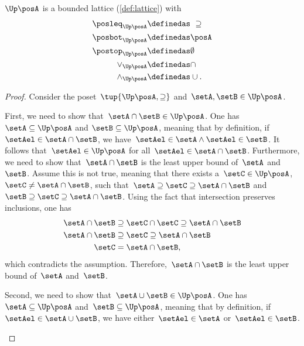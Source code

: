 \begin{lemma}
  \label{lem:u_bounded_lat}
  $\Up \posA$ is a bounded lattice (\cref{def:lattice}) with
  \begin{equation}
    \begin{aligned}
      \posleq_{\Up \posA}&\definedas \ \supseteq\\
      \posbot_{\Up \posA}&\definedas \posA\\
      \postop_{\Up \posA}&\definedas \emptyset\\
      \vee_{\Up \posA}&\definedas \cap\\
      \wedge_{\Up \posA}&\definedas \cup.
    \end{aligned}
\end{equation}
\end{lemma}
\begin{proof}
  Consider the poset~$\tup{\Up \posA,\supseteq}$ and~$\setA,\setB\in \Up \posA$.
  \begin{compactitem}
    \item First, we need to show that~$\setA\cap \setB\in \Up \posA$.
    One has~$\setA \subseteq \Up \posA$ and $\setB\subseteq \Up \posA$, meaning that by definition, if~$\setAel\in \setA\cap \setB$, we have~$\setAel \in \setA \wedge \setAel \in \setB$.
    It follows that~$\setAel \in \Up \posA$ for all~$\setAel \in \setA\cap \setB$.
    Furthermore, we need to show that~$\setA\cap \setB$ is the least upper bound of~$\setA$ and~$\setB$.
    Assume this is not true, meaning that  there exists a~$\setC\in \Up \posA$,~$\setC\neq \setA\cap \setB$, such that~$\setA\supseteq \setC\supseteq \setA\cap \setB$ and~$\setB\supseteq \setC\supseteq \setA\cap \setB$.
    Using the fact that intersection preserves inclusions, one has
    \begin{equation}
      \begin{aligned}
        \setA\cap \setB &\supseteq \setC\cap \setC \supseteq \setA\cap \setB\\
        \setA\cap \setB &\supseteq \setC \supseteq \setA\cap \setB\\
        \setC&= \setA\cap \setB,
      \end{aligned}
    \end{equation}
    which contradicts the assumption. Therefore,~$\setA\cap \setB$ is the least upper bound of~$\setA$ and~$\setB$.
    \item Second, we need to show that~$\setA\cup \setB\in \Up \posA$.
    One has~$\setA\subseteq \Up \posA$ and~$\setB\subseteq \Up \posA$, meaning that by definition, if~$\setAel\in \setA\cup \setB$, we have either~$\setAel\in \setA$ or~$\setAel\in \setB$.

\end{compactitem}
\end{proof}
